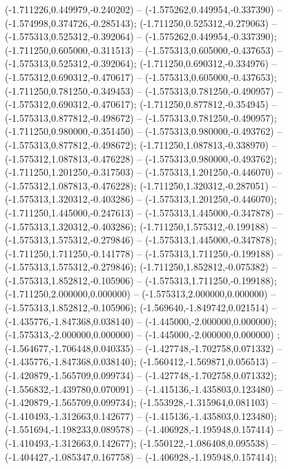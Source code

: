  (-1.711226,0.449979,-0.240202) -- (-1.575262,0.449954,-0.337390) -- (-1.574998,0.374726,-0.285143);
 (-1.711250,0.525312,-0.279063) -- (-1.575313,0.525312,-0.392064) -- (-1.575262,0.449954,-0.337390);
 (-1.711250,0.605000,-0.311513) -- (-1.575313,0.605000,-0.437653) -- (-1.575313,0.525312,-0.392064);
 (-1.711250,0.690312,-0.334976) -- (-1.575312,0.690312,-0.470617) -- (-1.575313,0.605000,-0.437653);
 (-1.711250,0.781250,-0.349453) -- (-1.575313,0.781250,-0.490957) -- (-1.575312,0.690312,-0.470617);
 (-1.711250,0.877812,-0.354945) -- (-1.575313,0.877812,-0.498672) -- (-1.575313,0.781250,-0.490957);
 (-1.711250,0.980000,-0.351450) -- (-1.575313,0.980000,-0.493762) -- (-1.575313,0.877812,-0.498672);
 (-1.711250,1.087813,-0.338970) -- (-1.575312,1.087813,-0.476228) -- (-1.575313,0.980000,-0.493762);
 (-1.711250,1.201250,-0.317503) -- (-1.575313,1.201250,-0.446070) -- (-1.575312,1.087813,-0.476228);
 (-1.711250,1.320312,-0.287051) -- (-1.575313,1.320312,-0.403286) -- (-1.575313,1.201250,-0.446070);
 (-1.711250,1.445000,-0.247613) -- (-1.575313,1.445000,-0.347878) -- (-1.575313,1.320312,-0.403286);
 (-1.711250,1.575312,-0.199188) -- (-1.575313,1.575312,-0.279846) -- (-1.575313,1.445000,-0.347878);
 (-1.711250,1.711250,-0.141778) -- (-1.575313,1.711250,-0.199188) -- (-1.575313,1.575312,-0.279846);
 (-1.711250,1.852812,-0.075382) -- (-1.575313,1.852812,-0.105906) -- (-1.575313,1.711250,-0.199188);
 (-1.711250,2.000000,0.000000) -- (-1.575313,2.000000,0.000000) -- (-1.575313,1.852812,-0.105906);
 (-1.569640,-1.849742,0.021514) -- (-1.435776,-1.847368,0.038140) -- (-1.445000,-2.000000,0.000000);
 (-1.575313,-2.000000,0.000000) -- (-1.445000,-2.000000,0.000000) ;
 (-1.564677,-1.706448,0.040335) -- (-1.427748,-1.702758,0.071332) -- (-1.435776,-1.847368,0.038140);
 (-1.560412,-1.569871,0.056513) -- (-1.420879,-1.565709,0.099734) -- (-1.427748,-1.702758,0.071332);
 (-1.556832,-1.439780,0.070091) -- (-1.415136,-1.435803,0.123480) -- (-1.420879,-1.565709,0.099734);
 (-1.553928,-1.315964,0.081103) -- (-1.410493,-1.312663,0.142677) -- (-1.415136,-1.435803,0.123480);
 (-1.551694,-1.198233,0.089578) -- (-1.406928,-1.195948,0.157414) -- (-1.410493,-1.312663,0.142677);
 (-1.550122,-1.086408,0.095538) -- (-1.404427,-1.085347,0.167758) -- (-1.406928,-1.195948,0.157414);
